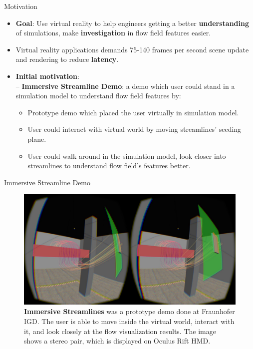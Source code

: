 \documentclass{beamer}
\begin{document}
\begin{frame}{Motivation}
	\begin{itemize}
		\item \textbf{Goal}: Use virtual reality to help engineers getting a better \textbf{understanding} of simulations, make \textbf{investigation} in flow field features easier.
		\item Virtual reality applications demands 75-140 frames per second scene update and rendering to reduce \textbf{latency}.
		\item \textbf{Initial motivation}:\\
		  -- \textbf{Immersive Streamline Demo}: a demo which user could stand in a simulation model to understand flow field features by:
		  \begin{itemize}
		  	\item Prototype demo which placed the user virtually in simulation model.
		  	\item User could interact with virtual world by moving streamlines' seeding plane.
		  	\item User could walk around in the simulation model, look closer into streamlines to understand flow field's features better.
		  \end{itemize} 
	\end{itemize}
\end{frame}

\begin{frame}{Immersive Streamline Demo}

	\begin{figure}[ht!]
	\centering
	\includegraphics[width=0.9\linewidth]{./figures/vr.png}
	\caption{\textbf{Immersive Streamlines} was a prototype demo done at Fraunhofer IGD. The user is able to move inside the virtual world, interact with it, and look closely at the flow visualization results. The image shows a stereo pair, which is displayed on Oculus Rift HMD. }
	\label{fig:vr_irpv}
	
	\end{figure}
\end{frame}
\end{document}
